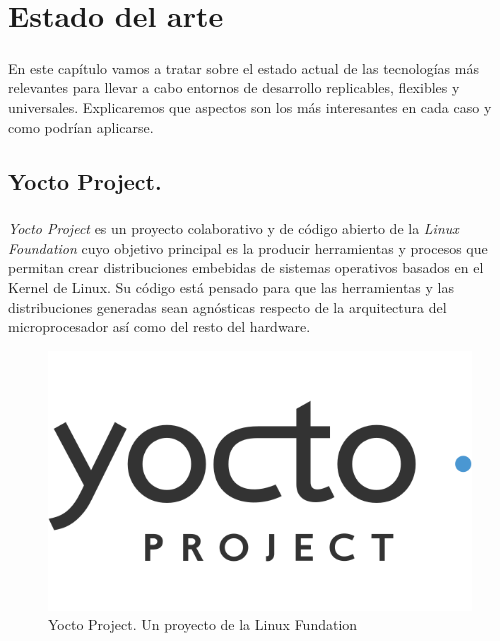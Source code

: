 \chapter{Estado del arte}\label{sec:estadodelarte}

\paragraph{}En este capítulo vamos a tratar sobre el estado actual de las tecnologías
más relevantes para llevar a cabo entornos de desarrollo replicables, flexibles y universales.
Explicaremos que aspectos son los más interesantes en cada caso y como podrían aplicarse.

\section{Yocto Project.}\label{sec:yocto}

\paragraph{} \emph{Yocto Project} es un proyecto colaborativo y de código abierto
de la \emph{Linux Foundation} cuyo objetivo principal es la producir herramientas y
procesos que permitan crear distribuciones embebidas de sistemas operativos basados
en el Kernel de Linux. Su código está pensado para que las herramientas y las distribuciones
generadas sean agnósticas respecto de la arquitectura del microprocesador así como del
resto del hardware.
\cite{yoctoprojectpage}

\begin{figure}[h]
	\centering
	\includegraphics[width=0.35\linewidth]{imgs/yocto-logo}
	\caption[Logo Yocto Project]{Yocto Project. Un proyecto de la Linux Fundation}
	\label{fig:yocto_logo}
\end{figure}

